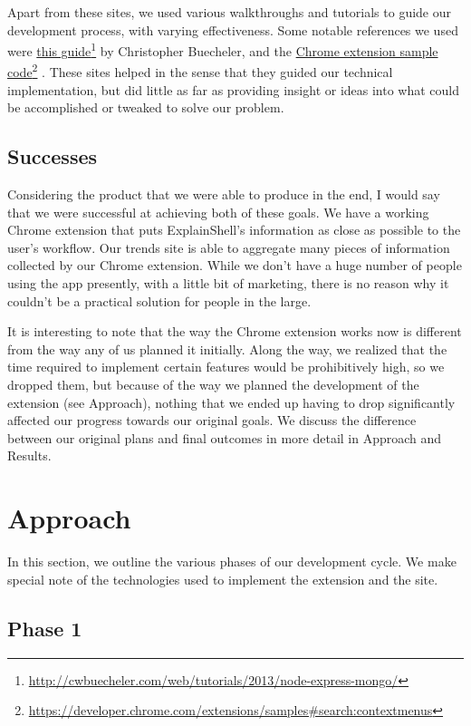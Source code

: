 \documentclass[11pt]{article}
\newcommand\fnurl[2]{%
\href{#1}{#2}\footnote{\url{#1}}%
}
\begin{document}
Apart from these sites, we used various walkthroughs and tutorials to guide our
development process, with varying effectiveness. Some notable references we used
were \fnurl{http://cwbuecheler.com/web/tutorials/2013/node-express-mongo/}{this
guide} by Christopher Buecheler, and the
\fnurl{https://developer.chrome.com/extensions/samples\#search:contextmenus}%
{Chrome extension sample code}. These sites helped in the sense that they guided
our technical implementation, but did little as far as providing insight or
ideas into what could be accomplished or tweaked to solve our problem.

\subsection{Successes}

Considering the product that we were able to produce in the end, I would say
that we were successful at achieving both of these goals. We have a working
Chrome extension that puts ExplainShell's information as close as possible to
the user's workflow. Our trends site is able to aggregate many pieces of
information collected by our Chrome extension. While we don't have a huge number
of people using the app presently, with a little bit of marketing, there is no
reason why it couldn't be a practical solution for people in the large.

It is interesting to note that the way the Chrome extension works now is
different from the way any of us planned it initially. Along the way, we
realized that the time required to implement certain features would be
prohibitively high, so we dropped them, but because of the way we planned the
development of the extension (see Approach), nothing that we ended up having to
drop significantly affected our progress towards our original goals. We discuss
the difference between our original plans and final outcomes in more detail in
Approach and Results.

\section{Approach}

In this section, we outline the various phases of our development cycle. We make
special note of the technologies used to implement the extension and the site.

\subsection{Phase 1}
\end{document}
